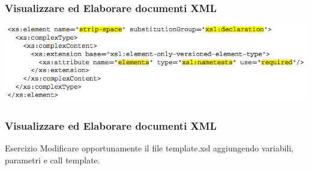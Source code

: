 \begin{frame}
    \frametitle{Visualizzare ed Elaborare documenti XML}
    \addtocounter{nframe}{1}
    
    \begin{center}
        \includegraphics[width=.95\textwidth]{imgs/Schema-strip-space.png}
    \end{center}

\end{frame}

\begin{frame}
    \frametitle{Visualizzare ed Elaborare documenti XML}
    \addtocounter{nframe}{1}
    
    \begin{block}{Esercizio}
        Modificare opportunamente il file template.xsl aggiungendo variabili, parametri e call template.
    \end{block}

\end{frame}


